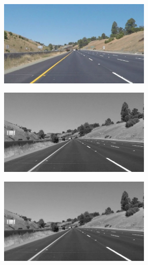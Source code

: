 \documentclass{article}
\begin{document}
\begin{figure}[htb!]
    \centering
    \caption{Line Detection Process}
    
    \begin{subfigure}{0.33\textwidth}
    \centering
    \includegraphics[width=0.8\textwidth]{image}
    \end{subfigure}%
    \begin{subfigure}{0.33\textwidth}
    \centering
    \includegraphics[width=0.8\textwidth]{gray}
    \end{subfigure}%
    \begin{subfigure}{0.33\textwidth}
    \centering
    \includegraphics[width=0.8\textwidth]{blurgray}
    \end{subfigure}
    \vspace{3em}
    

\end{figure}
\end{document}
